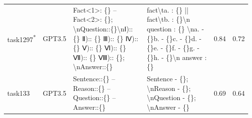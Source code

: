 \begin{longtable}{@{}p{0.8cm\tiny}p{1cm\tiny}p{4.1cm\ttfamily\tiny}p{4.1cm\ttfamily\tiny}p{0.8cm\tiny}p{0.8cm\tiny}@{}}
task1297\textsuperscript{*}  & GPT3.5    & Fact\textless{}1\textgreater{}: \{\} -- Fact\textless{}2\textgreater{}: \{\}; \textbackslash{}nQuestion::\{\}\textbackslash{}nⅠ):: \{\}  Ⅱ):: \{\}  Ⅲ):: \{\}  Ⅳ):: \{\}  Ⅴ):: \{\}  Ⅵ):: \{\}  Ⅶ):: \{\}  Ⅷ):: \{\}; \textbackslash{}nAnswer::\{\}                                                                                                                                                                                                                                                                     & fact\textbackslash{}ta. : \{\} || fact\textbackslash{}tb. : \{\}\textbackslash{}n question : \{\} \textbackslash{}na. - \{\}b. - \{\}c. - \{\}d. - \{\}e. - \{\}f. - \{\}g. - \{\}h. - \{\}\textbackslash{}n answer : \{\}                                                                                                                                                                                                                                                                                                                                                        & 0.84 & 0.72 \\
task133   & GPT3.5    & Sentence::\{\} -- Reason::\{\} -- Question::\{\} -- Answer::\{\}                                                                                                                                                                                                                                                                                                                                                                                                                                                        & Sentence - \{\}; \textbackslash{}nReason - \{\}; \textbackslash{}nQuestion - \{\}; \textbackslash{}nAnswer - \{\}                                                                                                                                                                                                                                                                                                                                                                                                                                                                 & 0.69 & 0.64 \\

\end{longtable}
